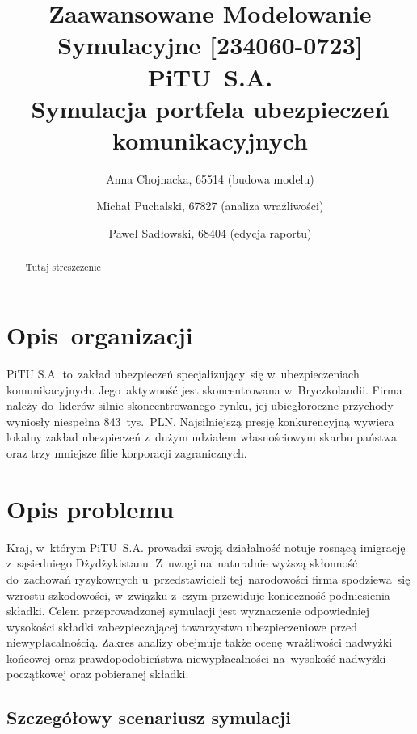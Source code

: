 \documentclass[12pt, a4paper, oneside]{mwart} %
\begin{document}
\title{Zaawansowane Modelowanie Symulacyjne [234060-0723]\\ 
\bigskip
PiTU~S.A.\\
Symulacja portfela ubezpieczeń komunikacyjnych}
\author{Anna Chojnacka, 65514 (budowa modelu) \and
Michał Puchalski, 67827 (analiza wrażliwości) \and
Paweł Sadłowski, 68404 (edycja raportu)}
\maketitle

\begin{abstract}
Tutaj streszczenie
\end{abstract}

\section{Opis~organizacji}
PiTU S.A. to~zakład ubezpieczeń specjalizujący~się w~ubezpieczeniach komunikacyjnych. Jego~aktywność jest skoncentrowana w~Bryczkolandii. Firma należy do~liderów silnie skoncentrowanego rynku, jej ubiegłoroczne przychody wyniosły niespełna 843~tys.~PLN. Najsilniejszą presję konkurencyjną wywiera lokalny zakład ubezpieczeń z~dużym udziałem własnościowym skarbu państwa oraz trzy mniejsze filie korporacji zagranicznych.

\section{Opis problemu}
Kraj, w~którym PiTU~S.A. prowadzi swoją działalność notuje rosnącą imigrację z~sąsiedniego Dżydżykistanu. Z~uwagi na~naturalnie wyższą skłonność do~zachowań ryzykownych u~przedstawicieli tej~narodowości firma spodziewa~się wzrostu szkodowości, w~związku z~czym przewiduje konieczność podniesienia składki. Celem przeprowadzonej symulacji jest wyznaczenie odpowiedniej wysokości składki zabezpieczającej towarzystwo ubezpieczeniowe przed niewypłacalnością. Zakres analizy obejmuje także ocenę wrażliwości nadwyżki końcowej oraz prawdopodobieństwa niewypłacalności na~wysokość nadwyżki początkowej oraz pobieranej składki.

\subsection{Szczegółowy scenariusz symulacji}
\end{document}
